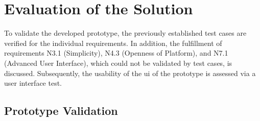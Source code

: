 

\section{Evaluation of the Solution}

To validate the developed prototype, the previously established test cases are verified for the individual requirements. In addition, the fulfillment of requirements N3.1 (Simplicity), N4.3 (Openness of Platform), and N7.1 (Advanced User Interface), which could not be validated by test cases, is discussed. Subsequently, the usability of the \ac{ui} of the prototype is assessed via a user interface test.

\subsection{Prototype Validation}

